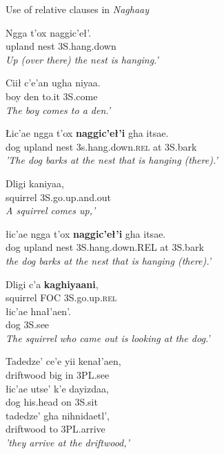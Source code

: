 \begin{exe}
\ex Use of relative clauses in \textit{Naghaay}\label{berez-ex11}
\begin{xlistn}

 \gll 	Ngga	t’ox 	naggic’eł’.\\
upland	nest		3S.hang.down\\
\glt \textit{Up (over there) the nest is hanging.’}

 \gll 			Ciił 	c’e’an	ugha	niyaa.\\
boy		den		to.it		3S.come\\
\glt \textit{The boy comes to a den.’}

 \gll 			Łic’ae	ngga	t’ox 	\textbf{naggic’eł’i	}		gha		itsae.\\
dog		upland	nest		3s.hang.down.\textsc{rel}	at		3S.bark\\
\glt \textit{'The dog barks at the nest that is hanging (there).'}

 \gll 			Dligi 		kaniyaa,\\
squirrel		3S.go.up.and.out\\
\glt \textit{A squirrel comes up,’}

 \gll 			łic’ae	ngga	t’ox 	\textbf{naggic’eł’i	}		gha		itsae.\\
dog		upland	nest		3S.hang.down.REL	at		3S.bark\\
\glt \textit{the dog barks at the nest that is hanging (there).’}

 \gll 			Dligi	c’a		\textbf{kaghiyaani},\\
squirrel \textsc{FOC} 3S.go.up.\textsc{rel}\\

 \gll 			łic’ae	hnał’aen’.\\
dog		3S.see\\
\glt \textit{The squirrel who came out is looking at the dog.’}

\sn	{[...]}

 \gll 			Tadedze’	ce’e 	yii 	kenał’aen,\\
driftwood	big		in	3PL.see\\

 \gll 			łic’ae	utse’ 		k’e	dayizdaa,\\
dog		his.head		on	3S.sit\\

 \gll 			tadedze’	gha		nihnidaetl’,\\
driftwood	to		3PL.arrive\\
\glt	\textit{'they arrive at the driftwood,'}


\end{xlistn}
\end{exe}
